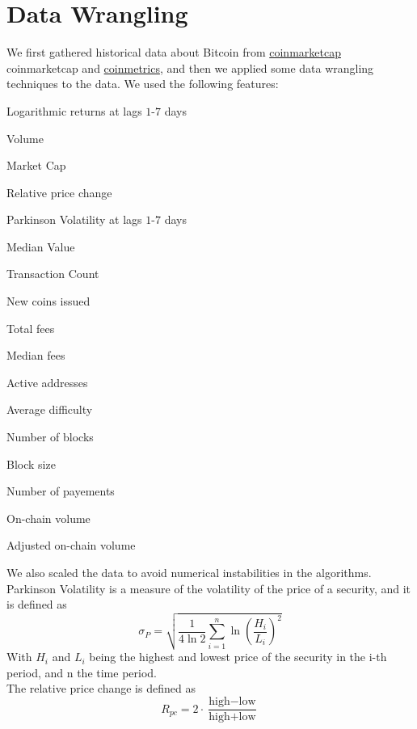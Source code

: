 \documentclass[12pt]{article}
\begin{document}
\section{Data Wrangling}
We first gathered historical data about Bitcoin from \href{https://coinmarketcap.com}{coinmarketcap} coinmarketcap and \href{https://coinmetrics.io}{coinmetrics}, and then we applied some data wrangling techniques to the data. We used the following features: 
\begin{list}{-}{ }
    \item Logarithmic returns at lags $1$-$7$ days
    \item Volume
    \item Market Cap
    \item Relative price change
    \item Parkinson Volatility at lags $1$-$7$ days
    \item Median Value
    \item Transaction Count
    \item New coins issued
    \item Total fees
    \item Median fees
    \item Active addresses
    \item Average difficulty
    \item Number of blocks
    \item Block size
    \item Number of payements
    \item On-chain volume
    \item Adjusted on-chain volume
\end{list}
We also scaled the data to avoid numerical instabilities in the algorithms.
\\Parkinson Volatility is a measure of the volatility of the price of a security, and it is defined as
\begin{equation}
    \sigma_P = \sqrt{\frac{1}{4\ln 2} \sum_{i=1}^n \ln \left( \frac{H_i}{L_i} \right)^2}
\end{equation}
With $H_i$ and $L_i$ being the highest and lowest price of the security in the i-th period, and n the time period.
\\The relative price change is defined as
\begin{equation}
    R_{pc} = 2 \cdot \frac{\text{high} - \text{low}}{\text{high} + \text{low}}
\end{equation}
\end{document}
